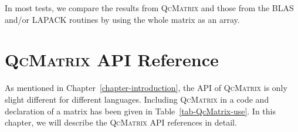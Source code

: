 \documentclass[a4paper,11pt,twoside,openright]{book}
\begin{document}
In most tests, we compare the results from \textsc{QcMatrix} and those from the
BLAS and/or LAPACK routines by using the whole matrix as an array.

\chapter{\textsc{QcMatrix} API Reference}
\label{chapter-API}

As mentioned in Chapter~\ref{chapter-introduction}, the API of \textsc{QcMatrix} is only
slight different for different languages. Including \textsc{QcMatrix} in a code and
declaration of a matrix has been given in Table~\ref{tab-QcMatrix-use}. In this chapter,
we will describe the \textsc{QcMatrix} API references in detail.
\end{document}
